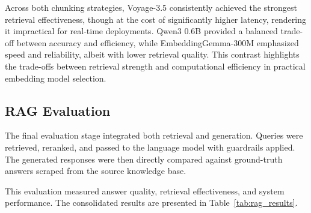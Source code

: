 	
	Across both chunking strategies, Voyage-3.5 consistently achieved the strongest retrieval effectiveness, though at the cost of significantly higher latency, rendering it impractical for real-time deployments. Qwen3 0.6B provided a balanced trade-off between accuracy and efficiency, while EmbeddingGemma-300M emphasized speed and reliability, albeit with lower retrieval quality. This contrast highlights the trade-offs between retrieval strength and computational efficiency in practical embedding model selection.
	
	\subsection{RAG Evaluation}
	The final evaluation stage integrated both retrieval and generation. Queries were retrieved, reranked, and passed to the language model with guardrails applied. The generated responses were then directly compared against ground-truth answers scraped from the source knowledge base.
	
	This evaluation measured answer quality, retrieval effectiveness, and system performance. The consolidated results are presented in Table~\ref{tab:rag_results}.
	
